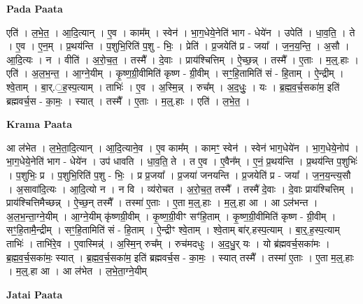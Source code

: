 \documentclass[17pt]{extarticle}
\begin{document}
\textbf{Pada Paata} \newline

एति॑ । ल॒भे॒त॒ । आ॒दि॒त्यान् । ए॒व । काम᳚म् । स्वेन॑ । भा॒ग॒धेये॒नेति॑ भाग - धेये॑न । उपेति॑ । धा॒व॒ति॒ । ते । ए॒व । ए॒न॒म् । प्र॒थय॑न्ति । प॒शुभि॒रिति॑ प॒शु - भिः॒ । प्रेति॑ । प्र॒जयेति॑ प्र - जया᳚ । ज॒न॒य॒न्ति॒ । अ॒सौ । आ॒दि॒त्यः । न । वीति॑ । अ॒रो॒च॒त॒ । तस्मै᳚ । दे॒वाः । प्राय॑श्चित्तिम् । ऐ॒च्छ॒न्न् । तस्मै᳚ । ए॒ताः । म॒ल्॒.हाः । एति॑ । अ॒ल॒भ॒न्त॒ । आ॒ग्ने॒यीम् । कृ॒ष्ण॒ग्री॒वीमिति॑ कृष्ण - ग्री॒वीम् । सꣳ॒॒हि॒तामिति॑ सं - हि॒ताम् । ऐ॒न्द्रीम् । श्वे॒ताम् । बा॒र्.॒ह॒स्प॒त्याम् । ताभिः॑ । ए॒व । अ॒स्मि॒न्न् । रुच᳚म् । अ॒द॒धुः॒ । यः । ब्र॒ह्म॒व॒र्च॒सका॑म॒ इति॑ ब्रह्मवर्च॒स - का॒मः॒ । स्यात् । तस्मै᳚ । ए॒ताः । म॒ल्॒.हाः । एति॑ । ल॒भे॒त॒ ।  \newline


\textbf{Krama Paata} \newline

आ ल॑भेत । ल॒भे॒ता॒दि॒त्यान् । आ॒दि॒त्याने॒व । ए॒व काम᳚म् । कामꣳ॒॒ स्वेन॑ । स्वेन॑ भाग॒धेये॑न । भा॒ग॒धेये॒नोप॑ । भा॒ग॒धेये॒नेति॑ भाग - धेये॑न । उप॑ धावति । धा॒व॒ति॒ ते । त ए॒व । ए॒वैन᳚म् । ए॒नं॒ प्र॒थय॑न्ति । प्र॒थय॑न्ति प॒शुभिः॑ । प॒शुभिः॒ प्र । प॒शुभि॒रिति॑ प॒शु - भिः॒ । प्र प्र॒जया᳚ । प्र॒जया॑ जनयन्ति । प्र॒जयेति॑ प्र - जया᳚ । ज॒न॒य॒न्त्य॒सौ । अ॒सावा॑दि॒त्यः । आ॒दि॒त्यो न । न वि । व्य॑रोचत । अ॒रो॒च॒त॒ तस्मै᳚ । तस्मै॑ दे॒वाः । दे॒वाः प्राय॑श्चित्तिम् । प्राय॑श्चित्तिमैच्छन्न् । ऐ॒च्छ॒न् तस्मै᳚ । तस्मा॑ ए॒ताः । ए॒ता म॒ल्॒.हाः । म॒ल्॒.हा आ । आ ऽल॑भन्त । अ॒ल॒भ॒न्ता॒ग्ने॒यीम् । आ॒ग्ने॒यीम् कृ॑ष्णग्री॒वीम् । कृ॒ष्ण॒ग्री॒वीꣳ सꣳ॑हि॒ताम् । कृ॒ष्ण॒ग्री॒वीमिति॑ कृष्ण - ग्री॒वीम् । सꣳ॒॒हि॒तामै॒न्द्रीम् । सꣳ॒॒हि॒तामिति॑ सं - हि॒ताम् । ऐ॒न्द्रीꣳ श्वे॒ताम् । श्वे॒ताम् बा॑र्.हस्प॒त्याम् । बा॒र्॒.ह॒स्प॒त्याम् ताभिः॑ । ताभि॑रे॒व । ए॒वास्मिन्न्॑ । अ॒स्मि॒न् रुच᳚म् । रुच॑मदधुः । अ॒द॒धु॒र् यः । यो ब्र॑ह्मवर्च॒सका॑मः । ब्र॒ह्म॒व॒र्च॒सका॑मः॒ स्यात् । ब्र॒ह्म॒व॒र्च॒सका॑म॒ इति॑ ब्रह्मवर्च॒स - का॒मः॒ । स्यात् तस्मै᳚ । तस्मा॑ ए॒ताः । ए॒ता म॒ल्॒.हाः । म॒ल्॒.हा आ । आ ल॑भेत । ल॒भे॒ता॒ग्ने॒यीम् \newline

\textbf{Jatai Paata} \newline
\end{document}
